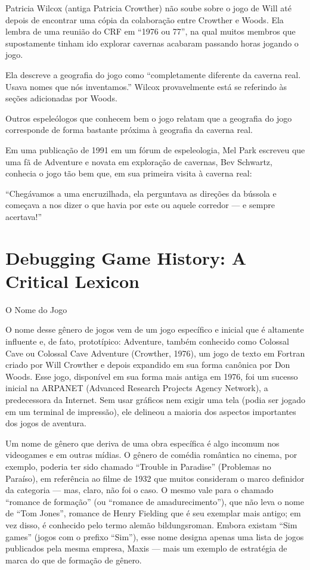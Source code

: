 \documentclass[12pt,a4paper]{article}
\begin{document}
Patricia Wilcox (antiga Patricia Crowther) não soube sobre o jogo de Will até depois de encontrar uma cópia da colaboração entre Crowther e Woods.
Ela lembra de uma reunião do CRF em “1976 ou 77”, na qual muitos membros que supostamente tinham ido explorar cavernas acabaram passando horas jogando o jogo.

Ela descreve a geografia do jogo como “completamente diferente da caverna real. Usava nomes que nós inventamos.”
Wilcox provavelmente está se referindo às seções adicionadas por Woods.

Outros espeleólogos que conhecem bem o jogo relatam que a geografia do jogo corresponde de forma bastante próxima à geografia da caverna real.

Em uma publicação de 1991 em um fórum de espeleologia, Mel Park escreveu que uma fã de Adventure e novata em exploração de cavernas, Bev Schwartz, conhecia o jogo tão bem que, em sua primeira visita à caverna real:

“Chegávamos a uma encruzilhada, ela perguntava as direções da bússola e começava a nos dizer o que havia por este ou aquele corredor — e sempre acertava!”

\section{Debugging Game History: A Critical Lexicon}
\textcite{lowood2024debugging}
O Nome do Jogo

O nome desse gênero de jogos vem de um jogo específico e inicial que é altamente influente e, de fato, prototípico: Adventure, também conhecido como Colossal Cave ou Colossal Cave Adventure (Crowther, 1976), um jogo de texto em Fortran criado por Will Crowther e depois expandido em sua forma canônica por Don Woods. Esse jogo, disponível em sua forma mais antiga em 1976, foi um sucesso inicial na ARPANET (Advanced Research Projects Agency Network), a predecessora da Internet. Sem usar gráficos nem exigir uma tela (podia ser jogado em um terminal de impressão), ele delineou a maioria dos aspectos importantes dos jogos de aventura.

Um nome de gênero que deriva de uma obra específica é algo incomum nos videogames e em outras mídias. O gênero de comédia romântica no cinema, por exemplo, poderia ter sido chamado “Trouble in Paradise” (Problemas no Paraíso), em referência ao filme de 1932 que muitos consideram o marco definidor da categoria — mas, claro, não foi o caso. O mesmo vale para o chamado “romance de formação” (ou “romance de amadurecimento”), que não leva o nome de “Tom Jones”, romance de Henry Fielding que é seu exemplar mais antigo; em vez disso, é conhecido pelo termo alemão bildungsroman.
Embora existam “Sim games” (jogos com o prefixo “Sim”), esse nome designa apenas uma lista de jogos publicados pela mesma empresa, Maxis — mais um exemplo de estratégia de marca do que de formação de gênero.
\end{document}
